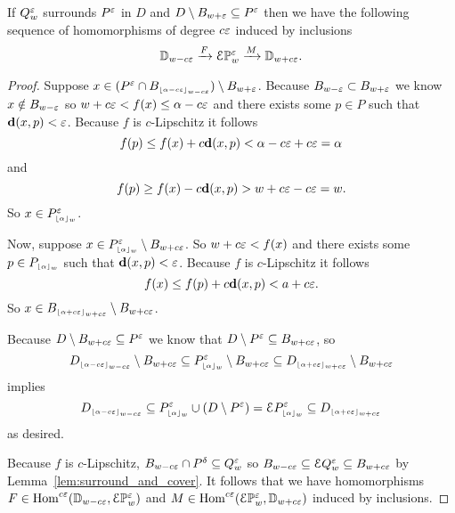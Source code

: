 \begin{lemma}\label{lem:p_interleave}
 If $Q_w^\e$ surrounds $P^\e$ in $D$ and $D\setminus B_{w + \e}\subseteq P^\e$ then we have the following sequence of homomorphisms of degree $c\e$ induced by inclusions
 \[\DD{w-c\e}\xrightarrow{F}\E\PP{w}{\e}\xrightarrow{M}\DD{w+c\e}.\]
\end{lemma}
\begin{proof}
  Suppose $x\in (P^\e\cap B\subi{w-c\e}{\alpha-c\e})\setminus B_{w+\e}$.
  Because $B_{w-\e}\subset B_{w+\e}$ we know $x\notin B_{w-\e}$ so $w+c\e < f(x)\leq \alpha-c\e$ and there exists some $p\in P$ such that $\dist(x, p) < \e$.
  Because $f$ is $c$-Lipschitz it follows
  \[ f(p)\leq f(x) + c\dist(x, p) < \alpha - c\e + c\e = \alpha\]
  and
  \[ f(p)\geq f(x) - c\dist(x, p) > w+c\e-c\e = w.\]
  So $x\in P\subi{w}{\alpha}^\e$.

  Now, suppose $x\in P\subi{w}{\alpha}^\e\setminus B_{w+c\e}$.
  So $w+c\e < f(x)$ and there exists some $p\in P\subi{w}{\alpha}$ such that $\dist(x,p) < \e$.
  Because $f$ is $c$-Lipschitz it follows
  \[ f(x) \leq f(p) + c\dist(x,p) < a + c\e.\]
  So $x\in B\subi{w+c\e}{\alpha+c\e}\setminus B_{w+c\e}$.

  Because $D\setminus B_{w+c\e}\subseteq P^\e$ we know that $D\setminus P^\e \subseteq B_{w+c\e}$, so
  \[D\subi{w-c\e}{\alpha-c\e}\setminus B_{w+c\e} \subseteq P\subi{w}{\alpha}^\e\setminus B_{w+c\e}\subseteq D\subi{w+c\e}{\alpha+c\e}\setminus B_{w+c\e}\]
  implies
  \[ D\subi{w-c\e}{\alpha-c\e}\subseteq P\subi{w}{\alpha}^\e\cup (D\setminus P^\e) = \ext{P\subi{w}{\alpha}^\e} \subseteq D\subi{w+c\e}{\alpha+c\e} \]
  as desired.

  Because $f$ is $c$-Lipschitz, $B_{w-c\e}\cap P^\delta\subseteq Q_{w}^\e$ so $B_{w-c\e} \subseteq \E Q_w^\e\subseteq B_{w+c\e}$ by Lemma~\ref{lem:surround_and_cover}.
  It follows that we have homomorphisms $F\in \Hom^{c\e}(\DD{w-c\e}, \E\PP{w}{\e})$ and $M\in\Hom^{c\e}(\E\PP{w}{\e}, \DD{w+c\e})$ induced by inclusions.
\end{proof}

